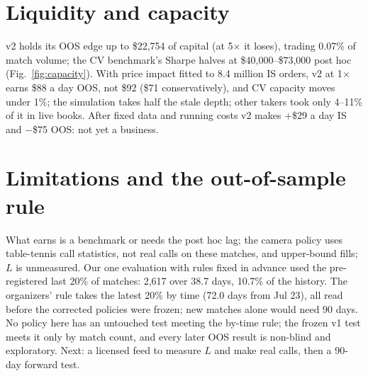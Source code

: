 \documentclass[11pt,letterpaper]{article}
\begin{document}
\section{Liquidity and capacity}\label{sec:liq}
v2 holds its OOS edge up to \$22,754 of capital (at 5\(\times\) it loses), trading
0.07\% of match volume; the CV benchmark's Sharpe halves at
\$40,000--\$73,000 post hoc (Fig.~\ref{fig:capacity}). With price impact fitted to
8.4 million IS orders, v2 at 1\(\times\) earns \$88 a day OOS, not
\$92 (\$71 conservatively), and CV capacity moves under
1\%; the simulation takes half the stale depth; other takers took only
4–11\% of it in live books. After fixed data and running costs v2 makes
+\$29 a day IS and −\$75 OOS: not yet a business.

\section{Limitations and the out-of-sample rule}\label{sec:limits}
What earns is a benchmark or needs the post hoc lag; the camera policy uses table-tennis call statistics,
not real calls on these matches, and upper-bound fills; \(L\) is unmeasured. Our one evaluation with rules fixed in
advance used the pre-registered last 20\% of matches: 2,617 over 38.7 days,
10.7\% of the history. The organizers' rule takes the latest 20\% by time
(72.0 days from Jul 23), all read before the corrected policies were frozen;
new matches alone would need 90 days. No policy here has an untouched test
meeting the by-time rule; the frozen v1 test meets it only by match count, and every later OOS result is non-blind and
exploratory. Next: a licensed feed to measure \(L\) and make real calls, then a 90-day forward test.\label{lastmain}

\clearpage
\renewcommand\refname{References}

{\raggedright\setlength\bibsep{2.5pt}}
\nocite{harvey2016,politis1994,bailey2017,harvey2017,huang2019,statsperform,nextio,sportradar,ably,regen2026,glsystemhaus,ispreview,thedesk,itia2026,brown2014,gi2026,prn2026,kalshiapi,french,newey1987}
\end{document}
